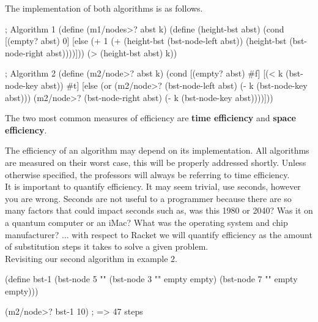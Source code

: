 \clearpage
The implementation of both algorithms is as follows.\\

\begin{code}[Lisp]
; Algorithm 1
(define (m1/nodes>? abst k)
	(define (height-bst abst)
		(cond
			[(empty? abst) 0]
			[else (+ 1 (+ (height-bst (bst-node-left abst))
			              (height-bst (bst-node-right abst))))]))
	(> (height-bst abst) k))

; Algorithm 2
(define (m2/node>? abst k)
	(cond
		[(empty? abst) #f]
		[(< k (bst-node-key abst)) #t]
		[else (or (m2/node>? (bst-node-left abst) (- k (bst-node-key abst)))
		          (m2/node>? (bst-node-right abst) (- k (bst-node-key abst))))]))
\end{code}


The two most common measures of efficiency are \textbf{time efficiency} and \textbf{space efficiency}.\\



The efficiency of an algorithm may depend on its implementation. All algorithms are measured on their worst case, this will be properly addressed shortly. Unless otherwise specified, the professors will always be referring to time efficiency.\\

It is important to quantify efficiency. It may seem trivial, use seconds, however you are wrong. Seconds are not useful to a programmer because there are so many factors that could impact seconds such as, was this 1980 or 2040? Was it on a quantum computer or an iMac? What was the operating system and chip manufacturer? ... with respect to Racket we will quantify efficiency as the amount of substitution steps it takes to solve a given problem.\\

Revisiting our second algorithm in example 2.\\

\begin{code}[Lisp]
(define bst-1 (bst-node 5 "" (bst-node 3 "" empty empty)
                             (bst-node 7 "" empty empty)))

(m2/node>? bst-1 10) ; => 47 steps
\end{code}

